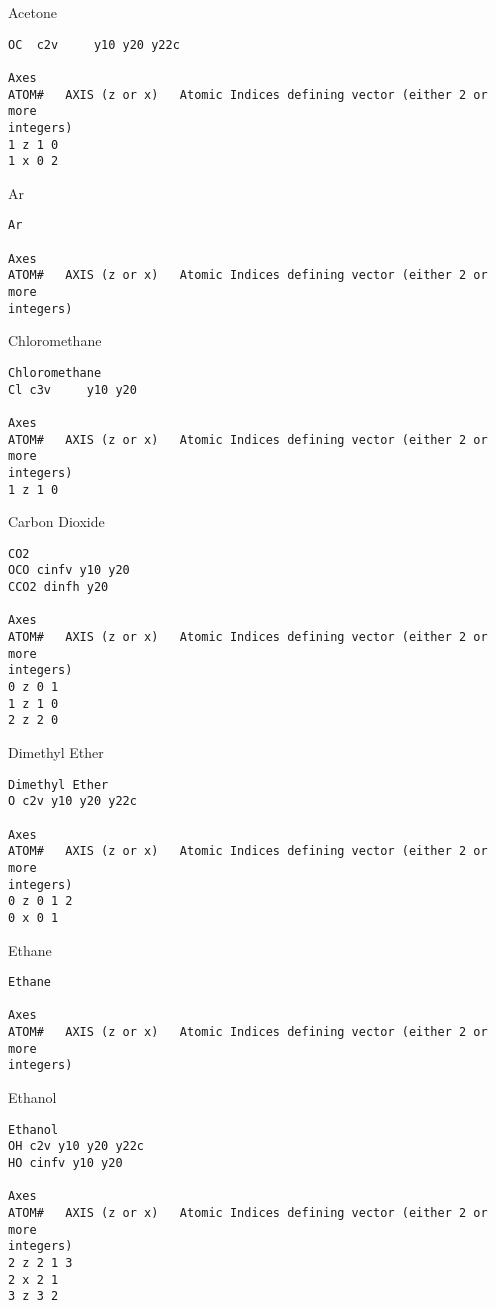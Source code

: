 \begin{subsection}{Acetone}
\begin{verbatim}
OC  c2v     y10 y20 y22c

Axes
ATOM#   AXIS (z or x)   Atomic Indices defining vector (either 2 or more
integers)
1 z 1 0
1 x 0 2
\end{verbatim}
\end{subsection}
\begin{subsection}{Ar}
\begin{verbatim}
Ar

Axes
ATOM#   AXIS (z or x)   Atomic Indices defining vector (either 2 or more
integers)
\end{verbatim}
\end{subsection}
\begin{subsection}{Chloromethane}
\begin{verbatim}
Chloromethane
Cl c3v     y10 y20

Axes
ATOM#   AXIS (z or x)   Atomic Indices defining vector (either 2 or more
integers)
1 z 1 0
\end{verbatim}
\end{subsection}
\begin{subsection}{Carbon Dioxide}
\begin{verbatim}
CO2
OCO cinfv y10 y20
CCO2 dinfh y20

Axes
ATOM#   AXIS (z or x)   Atomic Indices defining vector (either 2 or more
integers)
0 z 0 1
1 z 1 0
2 z 2 0
\end{verbatim}
\end{subsection}
\begin{subsection}{Dimethyl Ether}
\begin{verbatim}
Dimethyl Ether
O c2v y10 y20 y22c

Axes
ATOM#   AXIS (z or x)   Atomic Indices defining vector (either 2 or more
integers)
0 z 0 1 2
0 x 0 1
\end{verbatim}
\end{subsection}
\begin{subsection}{Ethane}
\begin{verbatim}
Ethane

Axes
ATOM#   AXIS (z or x)   Atomic Indices defining vector (either 2 or more
integers)
\end{verbatim}
\end{subsection}
\begin{subsection}{Ethanol}
\begin{verbatim}
Ethanol
OH c2v y10 y20 y22c
HO cinfv y10 y20

Axes
ATOM#   AXIS (z or x)   Atomic Indices defining vector (either 2 or more
integers)
2 z 2 1 3
2 x 2 1
3 z 3 2
\end{verbatim}
\end{subsection}
